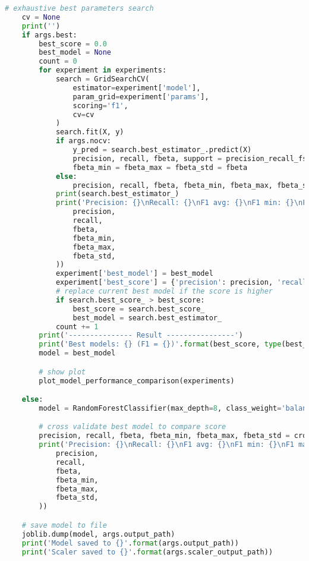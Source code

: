 \begin{lstlisting}[language=Python]
    # exhaustive best parameters search
    cv = None
    print('')
    if args.best:
        best_score = 0.0
        best_model = None
        count = 0
        for experiment in experiments:
            search = GridSearchCV(
                estimator=experiment['model'],
                param_grid=experiment['params'],
                scoring='f1',
                cv=cv
            )
            search.fit(X, y)
            if args.nocv:
                y_pred = search.best_estimator_.predict(X)
                precision, recall, fbeta, support = precision_recall_fscore_support(y, y_pred, average='binary')
                fbeta_min = fbeta_max = fbeta_std = fbeta
            else:
                precision, recall, fbeta, fbeta_min, fbeta_max, fbeta_std = cross_validate_precision_recall_fbeta(search.best_estimator_, X, y)
            print(search.best_estimator_)
            print('Precision: {}\nRecall: {}\nF1 avg: {}\nF1 min: {}\nF1 max: {}\nF1 std: {}\n'.format(
                precision,
                recall,
                fbeta,
                fbeta_min,
                fbeta_max,
                fbeta_std,
            ))
            experiment['best_model'] = best_model
            experiment['best_score'] = {'precision': precision, 'recall': recall, 'f1': fbeta}
            # replace current best model if the score is higher
            if search.best_score_ > best_score:
                best_score = search.best_score_
                best_model = search.best_estimator_
            count += 1
        print('--------------- Result ----------------')
        print('Best models: {} (F1 = {})'.format(best_score, type(best_model).__name__))
        model = best_model

        # show plot
        plot_model_performance_comparison(experiments)

    else:
        model = RandomForestClassifier(max_depth=8, class_weight='balanced', n_estimators=20, min_samples_split=5, max_features='auto', random_state=77)

        # cross validate best model to compare score
        precision, recall, fbeta, fbeta_min, fbeta_max, fbeta_std = cross_validate_precision_recall_fbeta(model, X, y)
        print('Precision: {}\nRecall: {}\nF1 avg: {}\nF1 min: {}\nF1 max: {}\nF1 std: {}\n'.format(
            precision,
            recall,
            fbeta,
            fbeta_min,
            fbeta_max,
            fbeta_std,
        ))

    # save model to file
    joblib.dump(model, args.output_path)
    print('Model saved to {}'.format(args.output_path))
    print('Scaler saved to {}'.format(args.scaler_output_path))
\end{lstlisting}

